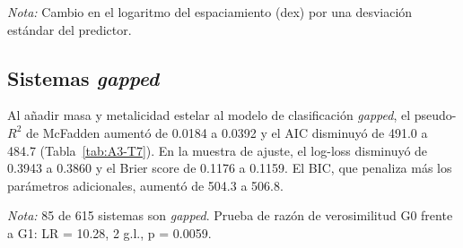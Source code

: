 \begin{table}[htbp]
    \centering
    \caption{Análisis III: coeficientes estandarizados del modelo estelar S1 del espaciamiento orbital.}
    \label{tab:A3-T6}
    \small
    \par\smallskip
    {\footnotesize\textit{Nota:} Cambio en el logaritmo del espaciamiento (dex) por una desviación estándar del predictor.}
\end{table}

\subsection{Sistemas \textit{gapped}}
\label{sec:res-gapped}

Al añadir masa y metalicidad estelar al modelo de clasificación \textit{gapped}, el pseudo-$R^2$ de McFadden aumentó de 0.0184 a 0.0392 y el AIC disminuyó de 491.0 a 484.7 (Tabla~\ref{tab:A3-T7}). En la muestra de ajuste, el log-loss disminuyó de 0.3943 a 0.3860 y el Brier score de 0.1176 a 0.1159. El BIC, que penaliza más los parámetros adicionales, aumentó de 504.3 a 506.8.

\begin{table}[htbp]
    \centering
    \caption{Análisis III: comparación de los modelos logísticos de la condición \textit{gapped}. Diferencias respecto al modelo base G0.}
    \label{tab:A3-T7}
    \small
    \par\smallskip
    {\footnotesize\textit{Nota:} 85 de 615 sistemas son \textit{gapped}. Prueba de razón de verosimilitud G0 frente a G1: LR = 10.28, 2 g.l., p = 0.0059.}
\end{table}

